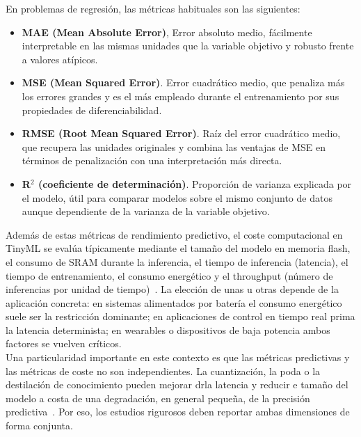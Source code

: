 \documentclass[a4paper,12pt,twoside,final]{book}
\begin{document}
En problemas de regresión, las métricas habituales son las siguientes:
\begin{itemize}
  \item \textbf{MAE (Mean Absolute Error)}, Error absoluto medio, fácilmente interpretable en las mismas unidades que
  la variable objetivo y robusto frente a valores atípicos.
  \item \textbf{MSE (Mean Squared Error)}. Error cuadrático medio, que penaliza más los errores grandes y es el más
  empleado durante el entrenamiento por sus propiedades de diferenciabilidad.
  \item \textbf{RMSE (Root Mean Squared Error)}. Raíz del error cuadrático medio, que recupera las unidades originales
  y combina las ventajas de MSE en términos de penalización con una interpretación más directa.
  \item \textbf{R$^2$ (coeficiente de determinación)}. Proporción de varianza explicada por el modelo, útil para
  comparar modelos sobre el mismo conjunto de datos aunque dependiente de la varianza de la variable objetivo.
\end{itemize}

Además de estas métricas de rendimiento predictivo, el coste computacional en TinyML se evalúa típicamente mediante
el tamaño del modelo en memoria flash, el consumo de SRAM durante la inferencia, el tiempo de inferencia (latencia),
el tiempo de entrenamiento, el consumo energético y el throughput (número de inferencias por unidad de
tiempo)~\cite{somvanshi2025acm,saha2022ieeejsen}. La elección de unas u otras depende de la aplicación concreta: en
sistemas alimentados por batería el consumo energético suele ser la restricción dominante; en aplicaciones de
control en tiempo real prima la latencia determinista; en wearables o dispositivos de baja potencia ambos factores
se vuelven críticos.\\

Una particularidad importante en este contexto es que las métricas predictivas y las métricas de coste no son
independientes. La cuantización, la poda o la destilación de conocimiento pueden mejorar drla latencia y reducir e
tamaño del modelo a costa de una degradación, en general pequeña, de la precisión predictiva~\cite{somvanshi2025acm}.
Por eso, los estudios rigurosos deben reportar ambas dimensiones de forma conjunta.
\end{document}
